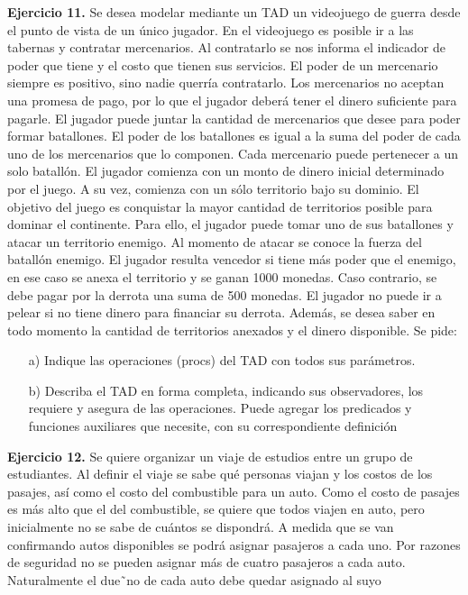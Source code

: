 \documentclass{article}
\begin{document}
\textbf{Ejercicio 11.} Se desea modelar mediante un TAD un videojuego de guerra desde el punto de vista de un \'unico jugador.
En el videojuego es posible ir a las tabernas y contratar mercenarios. Al contratarlo se nos informa el indicador de poder
que tiene y el costo que tienen sus servicios. El poder de un mercenario siempre es positivo, sino nadie querr\'ia contratarlo.
Los mercenarios no aceptan una promesa de pago, por lo que el jugador deber\'a tener el dinero suficiente para pagarle. El
jugador puede juntar la cantidad de mercenarios que desee para poder formar batallones. El poder de los batallones es igual
a la suma del poder de cada uno de los mercenarios que lo componen. Cada mercenario puede pertenecer a un solo batall\'on.
El jugador comienza con un monto de dinero inicial determinado por el juego. A su vez, comienza con un s\'olo territorio
bajo su dominio. El objetivo del juego es conquistar la mayor cantidad de territorios posible para dominar el continente.
Para ello, el jugador puede tomar uno de sus batallones y atacar un territorio enemigo. Al momento de atacar se conoce la
fuerza del batall\'on enemigo. El jugador resulta vencedor si tiene m\'as poder que el enemigo, en ese caso se anexa el territorio
y se ganan 1000 monedas. Caso contrario, se debe pagar por la derrota una suma de 500 monedas. El jugador no puede ir a
pelear si no tiene dinero para financiar su derrota.
Adem\'as, se desea saber en todo momento la cantidad de territorios anexados y el dinero disponible.
Se pide:
\begin{itemize}
    \item[a)] Indique las operaciones (procs) del TAD con todos sus par\'ametros.
    \item[b)] Describa el TAD en forma completa, indicando sus observadores, los requiere y asegura de las operaciones. Puede agregar
    los predicados y funciones auxiliares que necesite, con su correspondiente definici\'on
\end{itemize}
\textbf{Ejercicio 12.} Se quiere organizar un viaje de estudios entre un grupo de estudiantes. Al definir el viaje se sabe qu\'e personas
viajan y los costos de los pasajes, as\'i como el costo del combustible para un auto. Como el costo de pasajes es m\'as alto que
el del combustible, se quiere que todos viajen en auto, pero inicialmente no se sabe de cu\'antos se dispondr\'a.
A medida que se van confirmando autos disponibles se podr\'a asignar pasajeros a cada uno. Por razones de seguridad no
se pueden asignar m\'as de cuatro pasajeros a cada auto. Naturalmente el due˜no de cada auto debe quedar asignado al suyo
\end{document}
